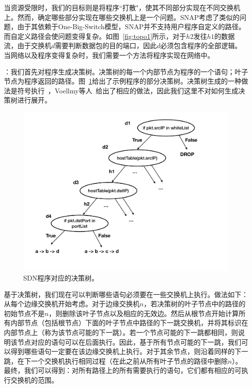 当资源受限时，我们的目标则是将程序``打散"，使其不同部分实现在不同交换机上。然而，确定哪些部分实现在哪些交换机上是一个问题。SNAP考虑了类似的问题，由于其依赖于One-Big-Switch模型，SNAP并不支持用户程序自定义的路径。而自定义路径会使问题变得复杂。如图~\ref{fig:topo1}所示，对于$h2$发往$h1$的数据流，由于交换机$d$需要判断数据包的目的端口，因此$d$必须包含程序的全部逻辑。当网络以及程序变得复杂时，我们需要一个方法将程序实现在网络中。



：我们首先对程序生成决策树。决策树的每一个内部节点为程序的一个语句；叶子节点为程序返回的路径。图~\ref{fig:dg}给出了示例程序的部分决策树。决策树生成的一种做法是符号执行~\cite{king1976symbolic}，Voellmy等人~\cite{magellan-poster}给出了相应的做法，因此我们这里不对如何生成决策树进行展开。

\begin{figure}[!htbp]
\includegraphics[width=0.8\linewidth]{figures/global-dt.pdf}
\centering
\caption{\small SDN程序对应的决策树。}
\label{fig:dg}
\end{figure}

基于决策树，我们现在可以判断哪些语句必须要在一些交换机上执行。做法如下：从每个边缘交换机开始考虑。对于边缘交换机$n$，若决策树的叶子节点中的路径的初始节点不是$n$，则删除该叶子节点以及相应的无效边。然后从根节点开始计算所有内部节点（包括根节点）下面的叶子节点中路径的下一跳交换机，并将其标识在内部节点上（称为该节点可能的下一跳）。若一个节点可能的下一跳都相同，则说明该节点对应的语句可以在后面执行。因此，基于所有节点可能的下一跳，我们可以得到哪些语句一定要在该边缘交换机上执行。对于其余节点，则沿着同样的下一跳，在下一个交换机执行相同过程（在此之前从所有叶子节点的路径中删除$n$）。最终，我们可以得到：对所有路径上的所有需要执行的语句，它们都有相应的可执行交换机的范围。

